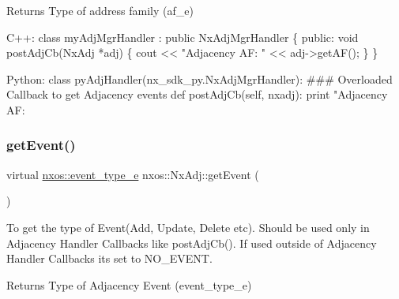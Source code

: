 \begin{DoxyReturn}{Returns}
Type of address family (af\+\_\+e)
\end{DoxyReturn}

\begin{DoxyCode}
C++:
   \textcolor{keyword}{class }myAdjMgrHandler : \textcolor{keyword}{public} NxAdjMgrHandler \{
      \textcolor{keyword}{public}:
         \textcolor{keywordtype}{void} postAdjCb(NxAdj *adj) \{
              cout << \textcolor{stringliteral}{"Adjacency AF: "} << adj->getAF();
         \}
   \}

Python:
   \textcolor{keyword}{class }pyAdjHandler(nx\_sdk\_py.NxAdjMgrHandler):
\textcolor{preprocessor}{   ### Overloaded Callback to get Adjacency events}
         def postAdjCb(self, nxadj):
             print "Adjacency AF: %
\end{DoxyCode}
 \mbox{\label{classnxos_1_1_nx_adj_a75c503c316c39c12aa8b4c431c81d2de}} 
\subsubsection{\texorpdfstring{get\+Event()}{getEvent()}}
{\footnotesize\ttfamily virtual \mbox{\hyperlink{nx__common_8h_af9a9040b7681199d386e94eb888018cb}{nxos\+::event\+\_\+type\+\_\+e}} nxos\+::\+Nx\+Adj\+::get\+Event (\begin{DoxyParamCaption}{ }\end{DoxyParamCaption})\hspace{0.3cm}{\ttfamily [pure virtual]}}

To get the type of Event(\+Add, Update, Delete etc). Should be used only in Adjacency Handler Callbacks like post\+Adj\+Cb(). If used outside of Adjacency Handler Callbacks its set to N\+O\+\_\+\+E\+V\+E\+NT.

\begin{DoxyReturn}{Returns}
Type of Adjacency Event (event\+\_\+type\+\_\+e)
\end{DoxyReturn}

